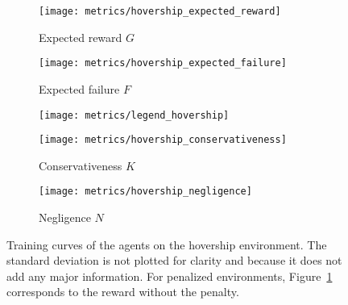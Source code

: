 \begin{figure}[t]
	\centering
	\begin{subfigure}{0.39\textwidth}
		\centering
		\texttt{[image: metrics/hovership\_expected\_reward]}
		\caption{Expected reward $G$}
		\label{fig:results:hovership:expected reward}
	\end{subfigure}
	\begin{subfigure}{0.39\textwidth}
		\centering
		\texttt{[image: metrics/hovership\_expected\_failure]}
		\caption{Expected failure $F$}
		\label{fig:results:hovership:expected failure}
	\end{subfigure}
	\begin{subfigure}{0.2\textwidth}
		\centering
		\texttt{[image: metrics/legend\_hovership]}
	\end{subfigure}
	\newline
	\begin{subfigure}{0.39\textwidth}
		\centering
		\texttt{[image: metrics/hovership\_conservativeness]}
		\caption{Conservativeness $K$}
		\label{fig:results:hovership:conservativeness}
	\end{subfigure}
	\begin{subfigure}{0.39\textwidth}
		\centering
		\texttt{[image: metrics/hovership\_negligence]}
		\caption{Negligence $N$}
		\label{fig:results:hovership:negligence}
	\end{subfigure}
	\begin{subfigure}{0.2\textwidth}
		\hfill
	\end{subfigure}
	\caption{Training curves of the agents on the hovership environment. The standard deviation is not plotted for clarity and because it does not add any major information. For penalized environments, Figure~\ref{fig:results:hovership:expected reward} corresponds to the reward without the penalty.}
	\label{fig:results:hovership}
\end{figure}

